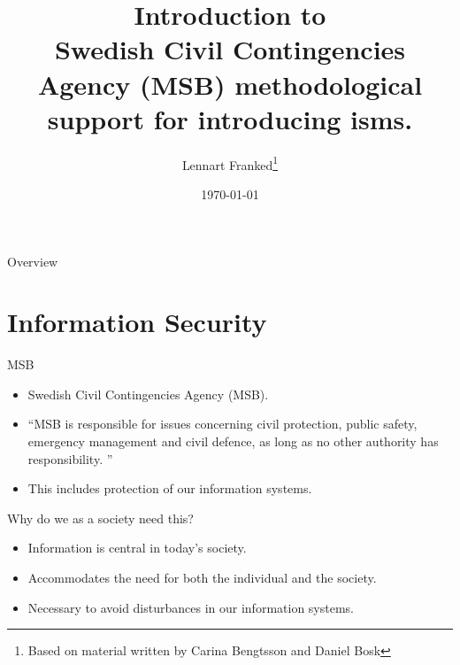 \documentclass{beamer}
\title[Intro infosäk]{%
  Introduction to\\
  Swedish Civil Contingencies Agency (MSB) methodological support for introducing \ac{isms}.
}
\author{Lennart Franked\footnote{Based on material written by
    Carina Bengtsson and Daniel Bosk}}
\institute[MIUN IST]{%
  Department of Informationsystem and Technologies (IST),\\
  Mid Sweden University, Sundsvall.

}
\date{\today}
\begin{document}
\begin{frame}
  \titlepage{}
\end{frame}

\begin{frame}{Overview}
	\tableofcontents
\end{frame}

\section[Information Security]{Information Security}

\begin{frame}{MSB}
  \begin{itemize}
    \item Swedish Civil Contingencies Agency (MSB).
    \item \enquote{MSB is responsible for issues concerning civil protection,
        public safety, emergency management and civil defence, as long as no
        other authority has responsibility\cite[About MSB]{msbse}\@.
        }
    \item This includes protection of our information systems.
  \end{itemize}
\end{frame}

\begin{frame}{Why do we as a society need this?}
  \begin{itemize}
    \item Information is central in today's society.
    \item Accommodates the need for both the individual and the society.
    \item Necessary to avoid disturbances in our information systems.
  \end{itemize}
\end{frame}
\end{document}
